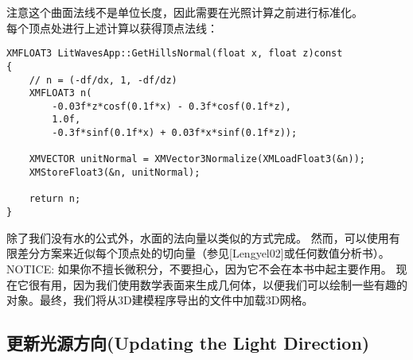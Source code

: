 \begin{flushleft}
注意这个曲面法线不是单位长度，因此需要在光照计算之前进行标准化。\\
每个顶点处进行上述计算以获得顶点法线：\\
\end{flushleft}

\begin{lstlisting}
XMFLOAT3 LitWavesApp::GetHillsNormal(float x, float z)const
{
    // n = (-df/dx, 1, -df/dz)
    XMFLOAT3 n(
        -0.03f*z*cosf(0.1f*x) - 0.3f*cosf(0.1f*z),
        1.0f,
        -0.3f*sinf(0.1f*x) + 0.03f*x*sinf(0.1f*z));

    XMVECTOR unitNormal = XMVector3Normalize(XMLoadFloat3(&n));
    XMStoreFloat3(&n, unitNormal);

    return n;
}
\end{lstlisting}

\begin{flushleft}
除了我们没有水的公式外，水面的法向量以类似的方式完成。 然而，可以使用有限差分方案来近似每个顶点处的切向量（参见[Lengyel02]或任何数值分析书）。\\

NOTICE: 如果你不擅长微积分，不要担心，因为它不会在本书中起主要作用。 现在它很有用，因为我们使用数学表面来生成几何体，以便我们可以绘制一些有趣的对象。最终，我们将从3D建模程序导出的文件中加载3D网格。
\end{flushleft}

\subsection{更新光源方向(Updating the Light Direction)}

